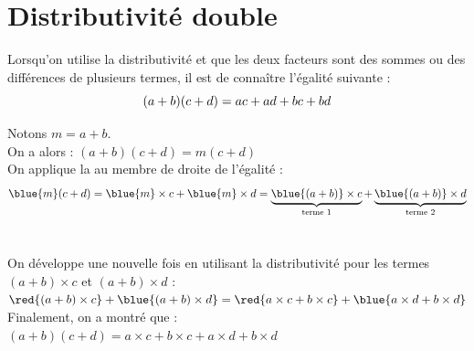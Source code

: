 \section{Distributivité double}
\begin{Propriete}
    Lorsqu'on utilise la distributivité et que les deux facteurs sont des sommes ou des différences de plusieurs termes, il est  de connaître l'égalité suivante : \\
    \[\Large(a+b)(c+d)=ac+ad+bc+bd\]
\end{Propriete}
\begin{Demonstration}
    \begin{crep}
        \begin{minipage}[t]{0.475\textwidth}
            Notons $m = a + b$. \\
            On a alors : $(a +b)(c + d) = m (c + d)$\\
            On applique la  au membre de droite de l'égalité :\\
            \[\blue{m} (c + d) = \blue{m} \times c + \blue{m} \times d
            = \underbrace{\blue{( a + b )} \times c}_{\text{terme 1}} + \underbrace{\blue{( a + b )} \times d}_{\text{terme 2}}\]\\
            
        \end{minipage}
        \hfill
        \begin{minipage}[t]{0.475\textwidth}
            On développe une nouvelle fois en utilisant la distributivité pour les termes $( a + b ) \times c$ et $( a + b ) \times d$ :\\
            $
                \red{( a + b ) \times c} + \blue{( a + b ) \times d} \\= \red{a \times c + b \times c} + \blue{a \times d + b \times d}
            $\\
            Finalement, on a montré que :\\
            $(a +b)(c + d) = a \times c + b \times c + a \times d + b \times d$
        \end{minipage}
    \end{crep}
\end{Demonstration}
